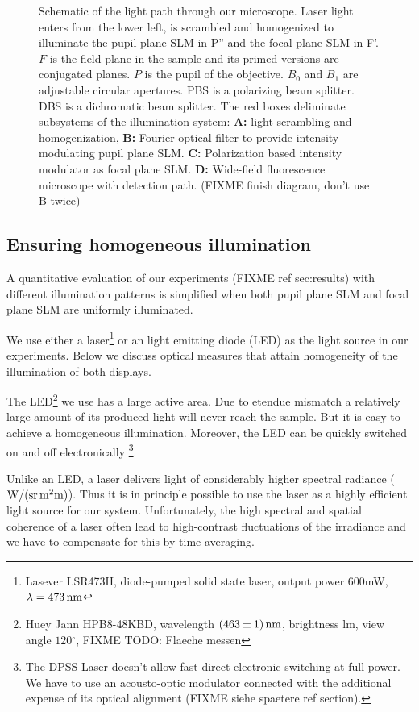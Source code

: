 \begin{figure}[!htbp]
  \centering
  \caption{Schematic of the light path through our microscope. Laser
    light enters from the lower left, is scrambled and homogenized to
    illuminate the pupil plane SLM in P'' and the focal plane SLM in
    F'. $F$ is the field plane in the sample and its primed versions
    are conjugated planes. $P$ is the pupil of the objective. $B_0$
    and $B_1$ are adjustable circular apertures. PBS is a polarizing
    beam splitter. DBS is a dichromatic beam splitter.  The red boxes
    deliminate subsystems of the illumination system: {\bf A:} light
    scrambling and homogenization, {\bf B:} Fourier-optical filter to
    provide intensity modulating pupil plane SLM. {\bf C:}
    Polarization based intensity modulator as focal plane SLM. {\bf
      D:} Wide-field fluorescence microscope with detection
    path. (FIXME finish diagram, don't use B twice)}
  \label{fig:memi-real}
\end{figure}

\subsection{Ensuring homogeneous illumination}
A quantitative evaluation of our experiments (FIXME ref sec:results)
with different illumination patterns is simplified when both pupil
plane SLM and focal plane SLM are uniformly illuminated.

We use either a laser\footnote{Lasever LSR473H, diode-pumped solid
  state laser, output power 600mW, $\lambda=\unit[473]{nm}$} or an
light emitting diode (LED)  as
the light source in our experiments. Below we discuss optical measures
that attain homogeneity of the illumination of both displays.

The LED\footnote{Huey Jann HPB8-48KBD, wavelength
  $\unit[(463\pm1)]{nm}$, brightness \unit[35]{lm}, view angle
  $120{}^\circ$, FIXME TODO: Flaeche messen} we use has a large active
area. Due to etendue mismatch a relatively large amount of its
produced light will never reach the sample. But it is easy to achieve
a homogeneous illumination. Moreover, the LED can be quickly switched
on and off electronically \footnote{The DPSS Laser doesn't allow fast
  direct electronic switching at full power. We have to use an
  acousto-optic modulator connected with the additional expense of its
  optical alignment (FIXME siehe spaetere ref section).}.

Unlike an LED, a laser delivers light of considerably higher spectral
radiance ($\unit[]{W/(sr\, m^2 m)}$). Thus it is in principle possible
to use the laser as a highly efficient light source for our
system. Unfortunately, the high spectral and spatial coherence of a
laser often lead to high-contrast fluctuations of the irradiance and
we have to compensate for this by time averaging.

